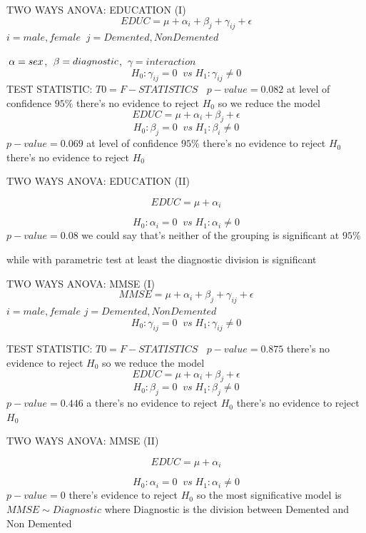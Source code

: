 \documentclass{beamer}
\begin{document}
	
	\begin{frame}{ TWO WAYS ANOVA: EDUCATION (I)}
	\vspace{-0.3cm}
 	$$ EDUC =   \mu + \alpha_i + \beta_j + \gamma_{ij} + \epsilon  $$
 	$ i ={male,female}$
 	$\: j={ Demented, Non Demented }$
 	
 	
 	$\: \alpha= sex \space$, 
	$\: \beta= diagnostic \space$, 
	$\: \gamma= interaction$
	$$
	H_0: \gamma_{ij}=0\; \;vs\;H_1:\gamma_{ij}\neq0 
	$$
	TEST STATISTIC: $ T0= F-STATISTICS \; $
	$\; p-value = 0.082 $
	at level of confidence $ 95\% $ there's no evidence to	reject $H_0$ 
	so we reduce the model
	\vspace{-0.2cm}
	$$ EDUC =  \mu + \alpha_i + \beta_j  + \epsilon $$
		$$
	H_0: \beta_j=0\; \;vs\;H_1:\beta_i\neq0 
	$$
	$p-value = 0.069$
	at level of confidence $ 95\% $ there's no evidence to	reject $H_0$ there's no  evidence to reject $H_0$ 
	
\end{frame}
	
\begin{frame}{TWO WAYS ANOVA: EDUCATION (II)}

	
	$$ EDUC =  \mu + \alpha_i  $$
	
		$$
	H_0:\alpha_i=0\; \;vs\;H_1:\alpha_i\neq0
	$$
	$p-value = 0.08 $
we could say that's neither of the grouping is significant at $95\%$ 

while with parametric test at least the diagnostic division is significant
\end{frame}
	\begin{frame}{ TWO WAYS ANOVA: MMSE (I)}
	$$ MMSE =   \mu + \alpha_i + \beta_j + \gamma_{ij} + \epsilon $$
		$ i ={male,female}$
	$ j={ Demented, Non Demented }$
	$$
	H_0: \gamma_{ij}=0\; \;vs\;H_1:\gamma_{ij}\neq0 
	$$
	
	TEST STATISTIC: $ T0= F-STATISTICS \;$
	$\; p-value = 0.875 $
	there's no evidence to	reject $H_0$ 
	so we reduce the model
	$$ EDUC =   \mu + \alpha_i + \beta_j  + \epsilon  $$
	$$
	H_0:\beta_j=0\; \;vs\;H_1:\beta_j\neq0 
	$$
	$p-value = 0.446$
	a there's no evidence to reject $H_0$ there's no  evidence to reject $H_0$ 
	
\end{frame}

\begin{frame}{TWO WAYS ANOVA: MMSE (II)}

	
	$$ EDUC =  \mu + \alpha_i $$
	
	$$
	H_0: \alpha_i =0\; \;vs\;H_1:\alpha_i \neq0 
	$$
	$p-value = 0$
	there's evidence to reject $H_0 $ 
	so the most significative model is $ MMSE \sim Diagnostic$
	where Diagnostic is the division between Demented and Non Demented
	\end{frame}
	
\end{document}
